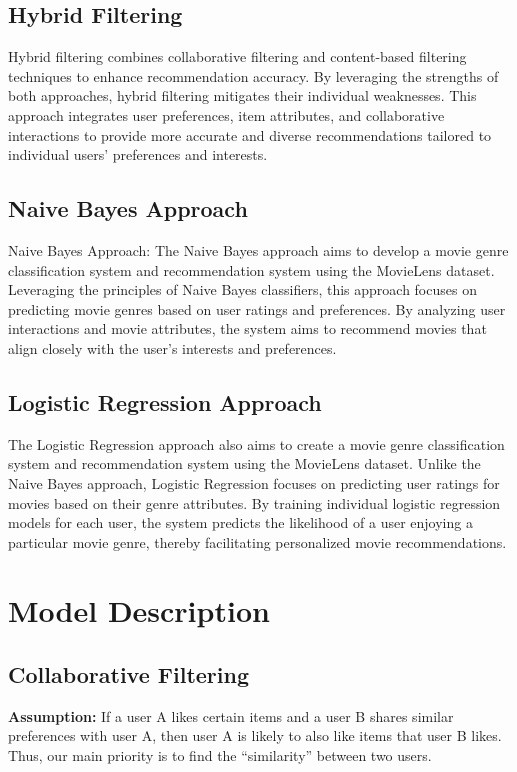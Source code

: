 \documentclass[a4paper]{article}
\theoremstyle{plain}
\theoremstyle{definition}
\begin{document}
\subsection*{Hybrid Filtering}
Hybrid filtering combines collaborative filtering and content-based filtering techniques to enhance recommendation accuracy. By leveraging the strengths of both approaches, hybrid filtering mitigates their individual weaknesses. This approach integrates user preferences, item attributes, and collaborative interactions to provide more accurate and diverse recommendations tailored to individual users' preferences and interests.


\subsection*{Naive Bayes Approach}
Naive Bayes Approach:
The Naive Bayes approach aims to develop a movie genre classification system and recommendation system using the MovieLens dataset. Leveraging the principles of Naive Bayes classifiers, this approach focuses on predicting movie genres based on user ratings and preferences. By analyzing user interactions and movie attributes, the system aims to recommend movies that align closely with the user's interests and preferences.

\subsection*{Logistic Regression Approach}
The Logistic Regression approach also aims to create a movie genre classification system and recommendation system using the MovieLens dataset. Unlike the Naive Bayes approach, Logistic Regression focuses on predicting user ratings for movies based on their genre attributes. By training individual logistic regression models for each user, the system predicts the likelihood of a user enjoying a particular movie genre, thereby facilitating personalized movie recommendations.

\section{Model Description}

\subsection{Collaborative Filtering}

    \textbf{Assumption:} If a user A likes certain items and a user B shares similar preferences with user A, then user A is likely to also like items that user B likes. Thus, our main priority is to find the “similarity” between two users.\\
\end{document}
